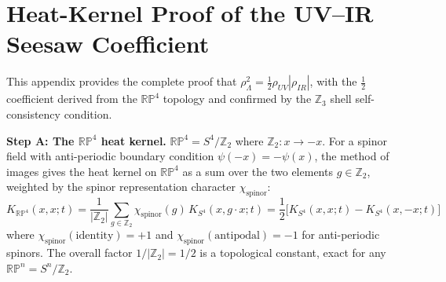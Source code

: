 \documentclass[12pt,a4paper]{article}
\begin{document}
\section{Heat-Kernel Proof of the UV--IR Seesaw Coefficient}
\label{app:seesaw_proof}

This appendix provides the complete proof that $\rho_\Lambda^2 = \tfrac{1}{2}\rho_{UV}|\rho_{IR}|$,
with the $\tfrac{1}{2}$ coefficient derived from the $\mathbb{RP}^4$ topology and confirmed
by the $\mathbb{Z}_3$ shell self-consistency condition.

\textbf{Step A: The $\mathbb{RP}^4$ heat kernel.}
$\mathbb{RP}^4 = S^4/\mathbb{Z}_2$ where $\mathbb{Z}_2 : x \to -x$.  For a spinor field with
anti-periodic boundary condition $\psi(-x) = -\psi(x)$, the method of images
\citep{Camporesi1994} gives the heat kernel on $\mathbb{RP}^4$ as a sum over the
two elements $g \in \mathbb{Z}_2$, weighted by the spinor representation character
$\chi_\mathrm{spinor}$:
\begin{equation}
  K_{\mathbb{RP}^4}(x,x;t)
  = \frac{1}{|\mathbb{Z}_2|}\sum_{g\in\mathbb{Z}_2}\chi_\mathrm{spinor}(g)\,K_{S^4}(x,g\cdot x;t)
  = \frac{1}{2}\bigl[K_{S^4}(x,x;t) - K_{S^4}(x,-x;t)\bigr]
  \label{eq:heatkernel}
\end{equation}
where $\chi_\mathrm{spinor}(\mathrm{identity}) = +1$ and
$\chi_\mathrm{spinor}(\mathrm{antipodal}) = -1$ for anti-periodic spinors.
The overall factor $1/|\mathbb{Z}_2| = 1/2$ is a topological constant, exact for
any $\mathbb{RP}^n = S^n/\mathbb{Z}_2$.
\end{document}
